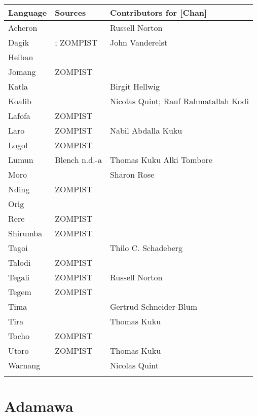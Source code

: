 \begin{table}
\begin{tabularx}{\textwidth}{lQQ}
\lsptoprule
\textbf{Language} & \textbf{Sources} & \textbf{Contributors for [Chan]}\\
\midrule 
Acheron & & Russell Norton \\
Dagik & \citealt{Vanderelst2016}; ZOMPIST & John Vanderelst \\
Heiban & \citealt{Guest1997} & ~ \\
Jomang & ZOMPIST & ~ \\
Katla & & Birgit Hellwig \\
Koalib & & Nicolas Quint; Rauf Rahmatallah Kodi \\
Lafofa & ZOMPIST & ~ \\
Laro & ZOMPIST & Nabil Abdalla Kuku \\
Logol & ZOMPIST & ~ \\
Lumun & Blench n.d.-a & Thomas Kuku Alki Tombore \\
Moro & \citealt{Blench2005} & Sharon Rose \\
Nding & ZOMPIST & ~ \\

Orig &   \citealt{SchadebergElias1979} & ~\\
Rere & ZOMPIST & ~\\
Shirumba & ZOMPIST & ~\\
Tagoi & & Thilo C. Schadeberg\\
Talodi & ZOMPIST & ~\\
Tegali & ZOMPIST & Russell Norton\\
Tegem & ZOMPIST & ~\\
Tima & & Gertrud Schneider-Blum\\
Tira & & Thomas Kuku\\
Tocho & ZOMPIST & ~\\
Utoro & ZOMPIST & Thomas Kuku\\
Warnang & & Nicolas Quint\\

\lspbottomrule
\end{tabularx}
\end{table}


\clearpage\section{Adamawa}

